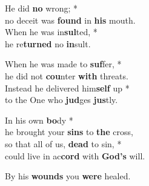 
He did \textbf{no} wrong; *\\
no deceit was \textbf{found} in \textbf{his} mouth.\\
When he was in\textbf{sul}ted, *\\
he re\textbf{turned} no \textbf{in}sult.

When he was made to \textbf{suf}fer, *\\
he did not \textbf{cou}nter \textbf{with} threats.\\
Instead he delivered him\textbf{self} up *\\
to the One who \textbf{jud}ges \textbf{jus}tly.

In his own \textbf{bo}dy *\\
he brought your \textbf{sins} to \textbf{the} cross,\\
so that all of us, \textbf{dead} to sin, *\\
could live in ac\textbf{cord} with \textbf{God’s} will.

By his \textbf{wounds} you \textbf{were} healed.
